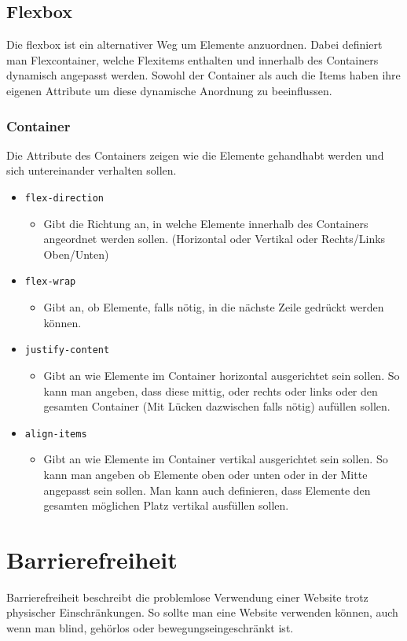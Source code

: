 \documentclass{article}
\begin{document}
	\subsection{Flexbox}
	Die flexbox ist ein alternativer Weg um Elemente anzuordnen. Dabei definiert man Flexcontainer, welche Flexitems enthalten und innerhalb des Containers dynamisch angepasst werden. Sowohl der Container als auch die Items haben ihre eigenen Attribute um diese dynamische Anordnung zu beeinflussen.
	\subsubsection{Container}
	Die Attribute des Containers zeigen wie die Elemente gehandhabt werden und sich untereinander verhalten sollen.
	\begin{itemize}
		\item{\texttt{flex-direction}}
		\begin{itemize}
			\item{Gibt die Richtung an, in welche Elemente innerhalb des Containers angeordnet werden sollen. (Horizontal oder Vertikal oder Rechts/Links Oben/Unten)}
		\end{itemize}
		\item{\texttt{flex-wrap}}
		\begin{itemize}
			\item{Gibt an, ob Elemente, falls nötig, in die nächste Zeile gedrückt werden können.}
		\end{itemize}
		\item{\texttt{justify-content}}
		\begin{itemize}
			\item{Gibt an wie Elemente im Container horizontal ausgerichtet sein sollen. So kann man angeben, dass diese mittig, oder rechts oder links oder den gesamten Container (Mit Lücken dazwischen falls nötig) aufüllen sollen.}
		\end{itemize}
		\item{\texttt{align-items}}
		\begin{itemize}
			\item{Gibt an wie Elemente im Container vertikal ausgerichtet sein sollen. So kann man angeben ob Elemente oben oder unten oder in der Mitte angepasst sein sollen. Man kann auch definieren, dass Elemente den gesamten möglichen Platz vertikal ausfüllen sollen.}
		\end{itemize}
	\end{itemize}
	\section{Barrierefreiheit}
	Barrierefreiheit beschreibt die problemlose Verwendung einer Website trotz physischer Einschränkungen. So sollte man eine Website verwenden können, auch wenn man blind, gehörlos oder bewegungseingeschränkt ist.
\end{document}
